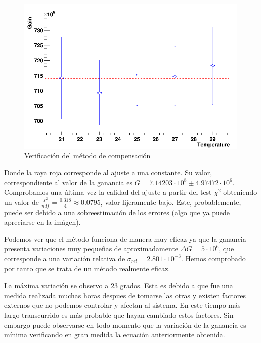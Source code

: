 \begin{figure}[hbtp]
\centering
\includegraphics[scale=0.4]{compensacion.png}
\caption{Verificación del método de compensación\label{compensacion}}
\end{figure}

Donde la raya roja corresponde al ajuste a una constante. Su valor, correspondiente al valor de la ganancia es $G=7.14203 \cdot 10^8 \pm 4.97472 \cdot 10^6$. Comprobamos una última vez la calidad del ajuste a partir del test $\chi^2$ obteniendo un valor de $\frac{\chi^2}{ndf}=\frac{0.318}{4}\approx 0.0795$, valor lijeramente bajo. Este, probablemente, puede ser debido a una sobreestimación de los errores (algo que ya puede apreciarse en la imágen).

Podemos ver que el método funciona de manera muy eficaz ya que la ganancia presenta variaciones muy pequeñas de aproximadamente $\Delta G=5 \cdot 10^6$, que corresponde a una variación relativa de $\sigma_{rel}=2.801 \cdot 10^{-3} $. Hemos comprobado por tanto que se trata de un método realmente eficaz.

La máxima variación se observo a 23 grados. Esta es debido a que fue una medida realizada muchas horas despues de tomarse las otras y existen factores externos que no podemos controlar y afectan al sistema. En este tiempo más largo transcurrido es más probable que hayan cambiado estos factores. Sin embargo puede observarse en todo momento que la variación de la ganancia es mínima verificando en gran medida la ecuación anteriormente obtenida.


